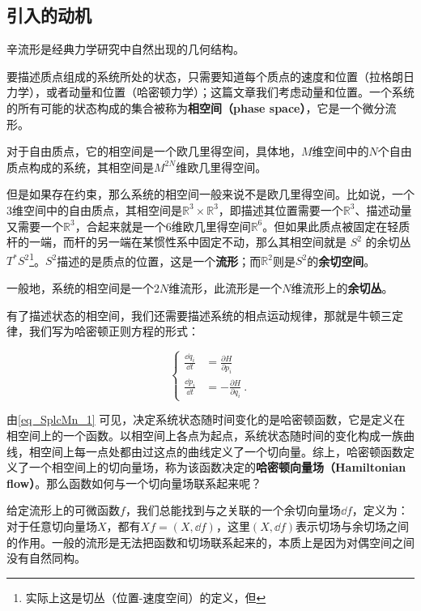 

\subsection{引入的动机}

辛流形是经典力学研究中自然出现的几何结构。

要描述质点组成的系统所处的状态，只需要知道每个质点的速度和位置（拉格朗日力学），或者动量和位置（哈密顿力学）；这篇文章我们考虑动量和位置。一个系统的所有可能的状态构成的集合被称为\textbf{相空间（phase space）}，它是一个微分流形。

对于自由质点，它的相空间是一个欧几里得空间，具体地，$M$维空间中的$N$个自由质点构成的系统，其相空间是$M^{2 N}$维欧几里得空间。

但是如果存在约束，那么系统的相空间一般来说不是欧几里得空间。比如说，一个$3$维空间中的自由质点，其相空间是$\mathbb{R}^3\times \mathbb{R}^3$，即描述其位置需要一个$\mathbb{R}^3$、描述动量又需要一个$\mathbb{R}^3$，合起来就是一个$6$维欧几里得空间$\mathbb{R}^6$。但如果此质点被固定在轻质杆的一端，而杆的另一端在某惯性系中固定不动，那么其相空间就是 $S^2$ 的余切丛$T^* S^2$\footnote{实际上这是切丛（位置-速度空间）的定义，但}。$S^2$描述的是质点的位置，这是一个\textbf{流形}；而$\mathbb{R}^2$则是$S^2$的\textbf{余切空间}。


一般地，系统的相空间是一个$2N$维流形，此流形是一个$N$维流形上的\textbf{余切丛}。

有了描述状态的相空间，我们还需要描述系统的相点运动规律，那就是牛顿三定律，我们写为哈密顿正则方程的形式：

\begin{equation}\label{eq_SplcMn_1}
\left\{
\begin{aligned}
\frac{\dd q_i}{\dd t} &= \frac{\partial H}{\partial p_i}\\
\frac{\dd p_i}{\dd t} &= -\frac{\partial H}{\partial q_i}~.
\end{aligned}
\right. 
\end{equation}

由\autoref{eq_SplcMn_1} 可见，决定系统状态随时间变化的是哈密顿函数，它是定义在相空间上的一个函数。以相空间上各点为起点，系统状态随时间的变化构成一族曲线，相空间上每一点处都由过这点的曲线定义了一个切向量。综上，哈密顿函数定义了一个相空间上的切向量场，称为该函数决定的\textbf{哈密顿向量场（Hamiltonian flow）}。那么函数如何与一个切向量场联系起来呢？

给定流形上的可微函数$f$，我们总能找到与之关联的一个余切向量场$\dd f$，定义为：对于任意切向量场$X$，都有$Xf = (X, \dd f)$，这里$(X, \dd f)$表示切场与余切场之间的作用。一般的流形是无法把函数和切场联系起来的，本质上是因为对偶空间之间没有自然同构。

